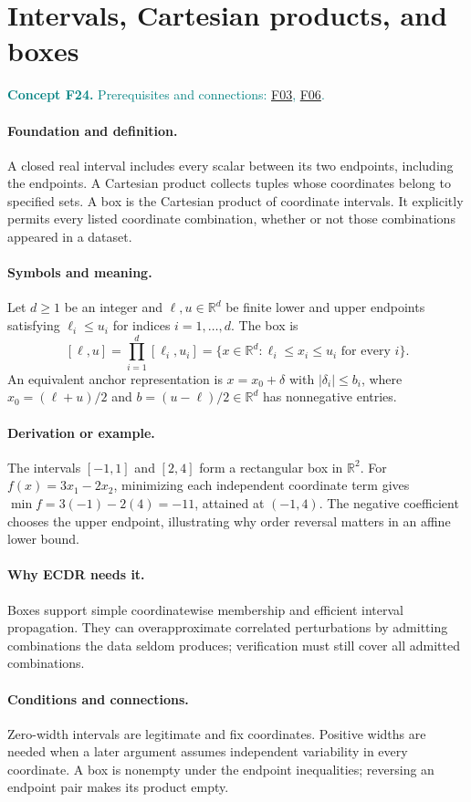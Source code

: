 \documentclass[11pt,a4paper]{article}
\newcommand{\R}{\mathbb R}
\newcommand{\conceptid}{Front matter}
\newcommand{\concept}[3]{\clearpage\renewcommand{\conceptid}{#1}%
\section{#2}\label{concept:#1}%
\textcolor{teal}{\textbf{Concept #1.} Prerequisites and connections: #3.}\par
\typeout{ECDR-CONCEPT-START #1 PAGE=\thepage}}
\begin{document}
\concept{F24}{Intervals, Cartesian products, and boxes}{\hyperref[concept:F03]{F03}, \hyperref[concept:F06]{F06}}
\paragraph{Foundation and definition.}
A closed real interval includes every scalar between its two endpoints,
including the endpoints. A Cartesian product collects tuples whose
coordinates belong to specified sets. A box is the Cartesian product
of coordinate intervals. It explicitly permits every listed coordinate
combination, whether or not those combinations appeared in a dataset.
\paragraph{Symbols and meaning.}
Let $d\ge1$ be an integer and $\ell,u\in\R^d$ be finite lower and
upper endpoints satisfying $\ell_i\le u_i$ for indices
$i=1,\ldots,d$. The box is
\[
 [\ell,u]=\prod_{i=1}^{d}[\ell_i,u_i]
 =\{x\in\R^d:\ell_i\le x_i\le u_i\text{ for every }i\}.
\]
An equivalent anchor representation is $x=x_0+\delta$ with
$|\delta_i|\le b_i$, where $x_0=(\ell+u)/2$ and
$b=(u-\ell)/2\in\R^d$ has nonnegative entries.
\paragraph{Derivation or example.}
The intervals $[-1,1]$ and $[2,4]$ form a rectangular box in $\R^2$.
For $f(x)=3x_1-2x_2$, minimizing each independent coordinate term
gives $\min f=3(-1)-2(4)=-11$, attained at $(-1,4)$.
The negative coefficient chooses the upper endpoint, illustrating why
order reversal matters in an affine lower bound.
\paragraph{Why ECDR needs it.}
Boxes support simple coordinatewise membership and efficient interval
propagation. They can overapproximate correlated perturbations by
admitting combinations the data seldom produces; verification must
still cover all admitted combinations.
\paragraph{Conditions and connections.}
Zero-width intervals are legitimate and fix coordinates. Positive widths
are needed when a later argument assumes independent variability in
every coordinate. A box is nonempty under the endpoint inequalities;
reversing an endpoint pair makes its product empty.
\par\label{endconcept:F24}
\end{document}
